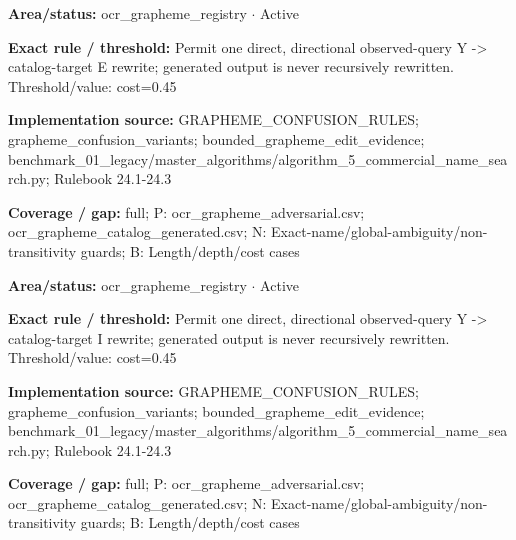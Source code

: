 \begin{tcolorbox}[enhanced,breakable,colback=white,colframe=Muted!45,boxrule=0.45pt,arc=1.5pt,left=6pt,right=6pt,top=5pt,bottom=5pt,title={\texttt{OCR-GRAPHEME-Y-TO-E}},title after break={\texttt{OCR-GRAPHEME-Y-TO-E}\ (continued)},fonttitle=\headingfont\bfseries\color{Navy},coltitle=Navy]
\textbf{Area/status:} ocr\_\allowbreak{}grapheme\_\allowbreak{}registry $\boldsymbol{\cdot}$ Active\par
\smallskip
\textbf{Exact rule / threshold:} Permit one direct, directional observed-query Y -> catalog-target E rewrite; generated output is never recursively rewritten. Threshold/\allowbreak{}value: cost=0.45\par
\smallskip
\textbf{Implementation source:} GRAPHEME\_\allowbreak{}CONFUSION\_\allowbreak{}RULES; grapheme\_\allowbreak{}confusion\_\allowbreak{}variants; bounded\_\allowbreak{}grapheme\_\allowbreak{}edit\_\allowbreak{}evidence; benchmark\_\allowbreak{}01\_\allowbreak{}legacy/\allowbreak{}master\_\allowbreak{}algorithms/\allowbreak{}algorithm\_\allowbreak{}5\_\allowbreak{}commercial\_\allowbreak{}name\_\allowbreak{}search.py; Rulebook 24.1-24.3\par
\smallskip
\textbf{Coverage / gap:} full; P: ocr\_\allowbreak{}grapheme\_\allowbreak{}adversarial.csv; ocr\_\allowbreak{}grapheme\_\allowbreak{}catalog\_\allowbreak{}generated.csv; N: Exact-name/\allowbreak{}global-ambiguity/\allowbreak{}non-transitivity guards; B: Length/\allowbreak{}depth/\allowbreak{}cost cases
\end{tcolorbox}
\begin{tcolorbox}[enhanced,breakable,colback=white,colframe=Muted!45,boxrule=0.45pt,arc=1.5pt,left=6pt,right=6pt,top=5pt,bottom=5pt,title={\texttt{OCR-GRAPHEME-Y-TO-I}},title after break={\texttt{OCR-GRAPHEME-Y-TO-I}\ (continued)},fonttitle=\headingfont\bfseries\color{Navy},coltitle=Navy]
\textbf{Area/status:} ocr\_\allowbreak{}grapheme\_\allowbreak{}registry $\boldsymbol{\cdot}$ Active\par
\smallskip
\textbf{Exact rule / threshold:} Permit one direct, directional observed-query Y -> catalog-target I rewrite; generated output is never recursively rewritten. Threshold/\allowbreak{}value: cost=0.45\par
\smallskip
\textbf{Implementation source:} GRAPHEME\_\allowbreak{}CONFUSION\_\allowbreak{}RULES; grapheme\_\allowbreak{}confusion\_\allowbreak{}variants; bounded\_\allowbreak{}grapheme\_\allowbreak{}edit\_\allowbreak{}evidence; benchmark\_\allowbreak{}01\_\allowbreak{}legacy/\allowbreak{}master\_\allowbreak{}algorithms/\allowbreak{}algorithm\_\allowbreak{}5\_\allowbreak{}commercial\_\allowbreak{}name\_\allowbreak{}search.py; Rulebook 24.1-24.3\par
\smallskip
\textbf{Coverage / gap:} full; P: ocr\_\allowbreak{}grapheme\_\allowbreak{}adversarial.csv; ocr\_\allowbreak{}grapheme\_\allowbreak{}catalog\_\allowbreak{}generated.csv; N: Exact-name/\allowbreak{}global-ambiguity/\allowbreak{}non-transitivity guards; B: Length/\allowbreak{}depth/\allowbreak{}cost cases
\end{tcolorbox}
